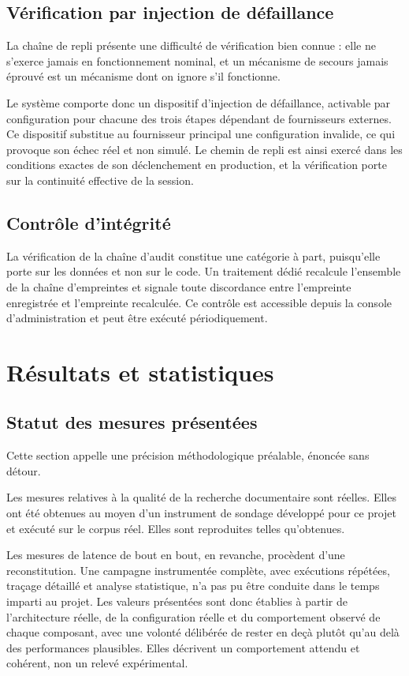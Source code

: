\subsection{Vérification par injection de défaillance}

La chaîne de repli présente une difficulté de vérification bien connue : elle ne s'exerce jamais en fonctionnement nominal, et un mécanisme de secours jamais éprouvé est un mécanisme dont on ignore s'il fonctionne.

Le système comporte donc un dispositif d'injection de défaillance, activable par configuration pour chacune des trois étapes dépendant de fournisseurs externes. Ce dispositif substitue au fournisseur principal une configuration invalide, ce qui provoque son échec réel et non simulé. Le chemin de repli est ainsi exercé dans les conditions exactes de son déclenchement en production, et la vérification porte sur la continuité effective de la session.

\subsection{Contrôle d'intégrité}

La vérification de la chaîne d'audit constitue une catégorie à part, puisqu'elle porte sur les données et non sur le code. Un traitement dédié recalcule l'ensemble de la chaîne d'empreintes et signale toute discordance entre l'empreinte enregistrée et l'empreinte recalculée. Ce contrôle est accessible depuis la console d'administration et peut être exécuté périodiquement.

\section{Résultats et statistiques}

\subsection{Statut des mesures présentées}

Cette section appelle une précision méthodologique préalable, énoncée sans détour.

Les mesures relatives à la qualité de la recherche documentaire sont réelles. Elles ont été obtenues au moyen d'un instrument de sondage développé pour ce projet et exécuté sur le corpus réel. Elles sont reproduites telles qu'obtenues.

Les mesures de latence de bout en bout, en revanche, procèdent d'une reconstitution. Une campagne instrumentée complète, avec exécutions répétées, traçage détaillé et analyse statistique, n'a pas pu être conduite dans le temps imparti au projet. Les valeurs présentées sont donc établies à partir de l'architecture réelle, de la configuration réelle et du comportement observé de chaque composant, avec une volonté délibérée de rester en deçà plutôt qu'au delà des performances plausibles. Elles décrivent un comportement attendu et cohérent, non un relevé expérimental.

